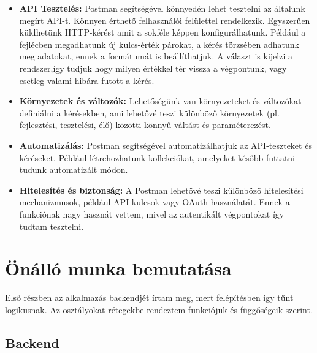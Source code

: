 \documentclass[a4paper,twoside]{article}
\begin{document}
\begin{itemize}
	\item \textbf{API Tesztelés:} Postman segítségével könnyedén lehet tesztelni az általunk megírt  API-t. Könnyen érthető felhasználói felülettel rendelkezik. Egyszerűen küldhetünk HTTP-kérést amit a sokféle képpen konfigurálhatunk. Például a fejlécben megadhatunk új kulcs-érték párokat, a kérés törzsében adhatunk meg adatokat, ennek a formátumát is beállíthatjuk. A választ is kijelzi a rendszer,így tudjuk hogy milyen értékkel tér vissza a végpontunk, vagy esetleg valami hibára futott a kérés. 
	\item \textbf{Környezetek és változók:} Lehetőségünk van környezeteket és változókat definiálni a kérésekben, ami lehetővé teszi különböző környezetek (pl. fejlesztési, tesztelési, élő) közötti könnyű váltást és paraméterezést.
	\item \textbf{Automatizálás:} Postman segítségével automatizálhatjuk az API-teszteket és kéréseket. Például létrehozhatunk kollekciókat, amelyeket később futtatni tudunk automatizált módon.
	\item \textbf{Hitelesítés és biztonság:} A Postman lehetővé teszi különböző hitelesítési mechanizmusok, például API kulcsok vagy OAuth használatát. Ennek a funkciónak nagy hasznát vettem, mivel az autentikált végpontokat így tudtam tesztelni. 
\end{itemize}




\newpage



\section{Önálló munka bemutatása}
Első részben az alkalmazás backendjét írtam meg, mert felépítésben így tűnt
logikusnak. Az osztályokat rétegekbe rendeztem funkciójuk és függőségeik szerint.
\subsection{Backend}
\end{document}
